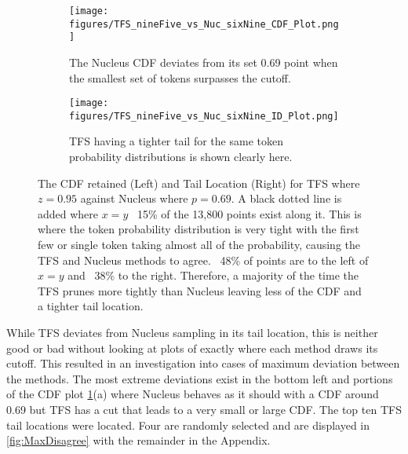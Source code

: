 \documentclass{article}
\begin{document}
\begin{figure}[h]
 
	    \begin{subfigure}{0.5\textwidth}
	    \texttt{[image: figures/TFS\_nineFive\_vs\_Nuc\_sixNine\_CDF\_Plot.png]} 
	    \caption{The Nucleus CDF deviates from its set 0.69 point when the smallest set of tokens surpasses the cutoff.}
	    \end{subfigure}
	    
	    \begin{subfigure}{0.5\textwidth}
	    \texttt{[image: figures/TFS\_nineFive\_vs\_Nuc\_sixNine\_ID\_Plot.png]}
	    \caption{TFS having a tighter tail for the same token probability distributions is shown clearly here.}
	    \end{subfigure}
 
	\caption{The CDF retained (Left) and Tail Location (Right) for TFS where $z=0.95$ against Nucleus where $p=0.69$. A black dotted line is added where $x=y$ ~15\% of the 13,800 points exist along it. This is where the token probability distribution is very tight with the first few or single token taking almost all of the probability, causing the TFS and Nucleus methods to agree. ~48\% of points are to the left of $x=y$ and ~38\% to the right. Therefore, a majority of the time the TFS prunes more tightly than Nucleus leaving less of the CDF and a tighter tail location. }
	\label{fig:DiffTFSvsNucScatter}
\end{figure}

While TFS deviates from Nucleus sampling in its tail location, this is neither good or bad without looking at plots of exactly where each method draws its cutoff. This resulted in an investigation into cases of maximum deviation between the methods. The most extreme deviations exist in the bottom left and portions of the CDF plot \ref{fig:DiffTFSvsNucScatter}(a) where Nucleus behaves as it should with a CDF around 0.69 but TFS has a cut that leads to a very small or large CDF. The top ten TFS tail locations were located. Four are randomly selected and are displayed in \ref{fig:MaxDisagree} with the remainder in the Appendix.
\end{document}
